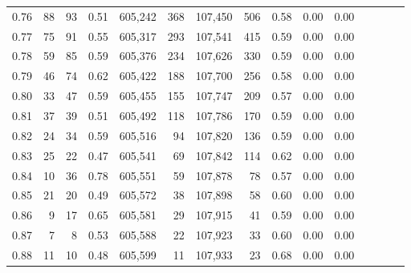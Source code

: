 \begin{tabular}{rrrcrrrrrrrrrrr}
0.76 &      88 &     93 &                                       0.51 &  605,242 &      368 &  107,450 &      506 &  0.58 &  0.00 &                         0.00 \\
0.77 &      75 &     91 &                                       0.55 &  605,317 &      293 &  107,541 &      415 &  0.59 &  0.00 &                         0.00 \\
0.78 &      59 &     85 &                                       0.59 &  605,376 &      234 &  107,626 &      330 &  0.59 &  0.00 &                         0.00 \\
0.79 &      46 &     74 &                                       0.62 &  605,422 &      188 &  107,700 &      256 &  0.58 &  0.00 &                         0.00 \\
0.80 &      33 &     47 &                                       0.59 &  605,455 &      155 &  107,747 &      209 &  0.57 &  0.00 &                         0.00 \\
0.81 &      37 &     39 &                                       0.51 &  605,492 &      118 &  107,786 &      170 &  0.59 &  0.00 &                         0.00 \\
0.82 &      24 &     34 &                                       0.59 &  605,516 &       94 &  107,820 &      136 &  0.59 &  0.00 &                         0.00 \\
0.83 &      25 &     22 &                                       0.47 &  605,541 &       69 &  107,842 &      114 &  0.62 &  0.00 &                         0.00 \\
0.84 &      10 &     36 &                                       0.78 &  605,551 &       59 &  107,878 &       78 &  0.57 &  0.00 &                         0.00 \\
0.85 &      21 &     20 &                                       0.49 &  605,572 &       38 &  107,898 &       58 &  0.60 &  0.00 &                         0.00 \\
0.86 &       9 &     17 &                                       0.65 &  605,581 &       29 &  107,915 &       41 &  0.59 &  0.00 &                         0.00 \\
0.87 &       7 &      8 &                                       0.53 &  605,588 &       22 &  107,923 &       33 &  0.60 &  0.00 &                         0.00 \\
0.88 &      11 &     10 &                                       0.48 &  605,599 &       11 &  107,933 &       23 &  0.68 &  0.00 &                         0.00 \\

\end{tabular}
